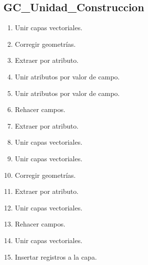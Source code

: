 \documentclass[letterpaper,10pt,spanish]{sphinxmanual}
\begin{document}
\subsection{GC\_Unidad\_Construccion}
\label{\detokenize{ETL_Cobol/Model:gc-unidad-construccion}}\begin{enumerate}
%
\item {} 
Unir capas vectoriales.

\item {} 
Corregir geometrías.

\item {} 
Extraer por atributo.

\item {} 
Unir atributos por valor de campo.

\item {} 
Unir atributos por valor de campo.

\item {} 
Rehacer campos.

\item {} 
Extraer por atributo.

\item {} 
Unir capas vectoriales.

\item {} 
Unir capas vectoriales.

\item {} 
Corregir geometrías.

\item {} 
Extraer por atributo.

\item {} 
Unir capas vectoriales.

\item {} 
Rehacer campos.

\item {} 
Unir capas vectoriales.

\item {} 
Insertar registros a la capa.


\end{enumerate}
\end{document}
